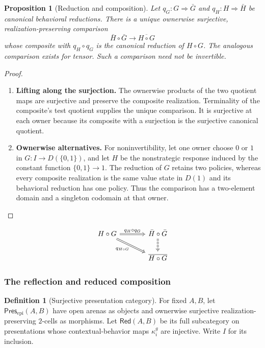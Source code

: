 \documentclass[11pt,a4paper]{article}
\numberwithin{equation}{section}
\newtheorem{proposition}[theorem]{Proposition}
\theoremstyle{definition}
\newtheorem{definition}[theorem]{Definition}
\theoremstyle{remark}
\theoremstyle{plain}
\begin{document}
\begin{proposition}[Reduction and composition]
\label{prop:egt-reduction-comparison}
Let $q_G:G\Rightarrow\bar G$ and $q_H:H\Rightarrow\bar H$ be canonical
behavioral reductions. There is a unique ownerwise surjective,
realization-preserving comparison
\[
 \bar H\circ\bar G\longrightarrow\overline{H\circ G}
\]
whose composite with $q_H\circ q_G$ is the canonical reduction of
$H\circ G$. The analogous comparison exists for tensor. Such a comparison
need not be invertible.
\end{proposition}
\begin{proof}
\leavevmode
\begin{enumerate}[label=\textup{(\arabic*)},leftmargin=*,itemsep=4pt,topsep=3pt]
  \item \textbf{Lifting along the surjection.} The ownerwise products of the two quotient maps are surjective and preserve
the composite realization. Terminality of the composite's test quotient
supplies the unique comparison. It is surjective at each owner because its
composite with a surjection is the surjective canonical quotient.
  \item \textbf{Ownerwise alternatives.} For noninvertibility, let one owner choose $0$ or $1$ in
$G:I\to D(\{0,1\})$, and let $H$ be the nonstrategic response induced by
the constant function $\{0,1\}\to1$. The reduction of $G$ retains two
policies, whereas every composite realization is the same value state in
$D(1)$ and its behavioral reduction has one policy. Thus the comparison
has a two-element domain and a singleton codomain at that owner.
\end{enumerate}
\end{proof}

\[
\begin{tikzcd}[column sep=large]
 H\circ G\arrow[r,Rightarrow,"q_H\circ q_G"]
 \arrow[dr,Rightarrow,"q_{H\circ G}"']&
 \bar H\circ\bar G\arrow[d,Rightarrow,dashed]\\
 &\overline{H\circ G}
\end{tikzcd}
\]

\subsubsection{The reflection and reduced composition}

\begin{definition}[Surjective presentation category]
\label{def:egt-surjective-presentation-category}
For fixed $A,B$, let $\mathsf{Pres}_{\mathrm{epi}}(A,B)$ have open arenas as objects and ownerwise surjective realization-preserving
$2$-cells as morphisms. Let $\mathsf{Red}(A,B)$ be its full subcategory
on presentations whose contextual-behavior maps $\kappa_i^g$ are
injective. Write $I$ for its inclusion.
\end{definition}
\end{document}
